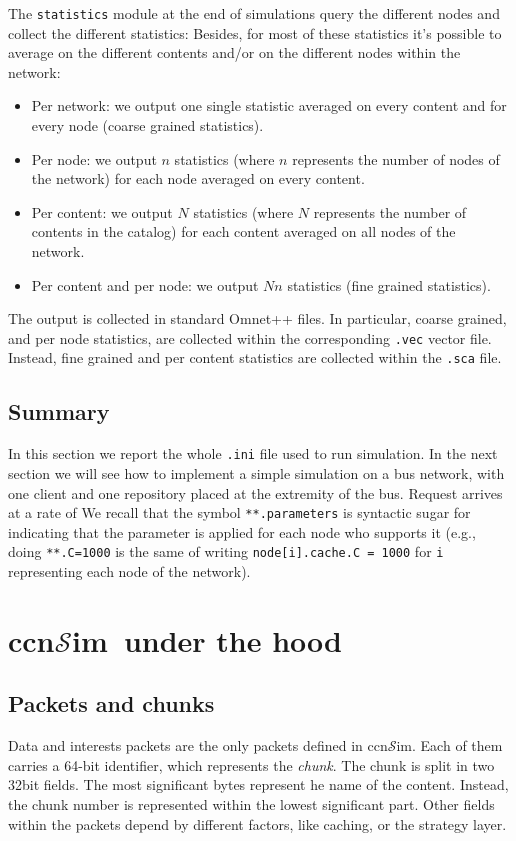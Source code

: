 \documentclass{article}
\newcommand{\ccnsim}{ccn$\mathcal{S}$im}
\begin{document}
The \verb|statistics| module at the end of simulations query the different nodes and collect the different statistics: Besides, for most of these statistics it's possible to average on the different contents and/or on the different nodes within the network:
\begin{itemize}
    \item Per network: we output one single statistic averaged on every content and for every node (coarse grained statistics).
    \item Per node: we output $n$ statistics (where $n$ represents the number of nodes of the network) for each node averaged on every content.
    \item Per content: we output $N$ statistics (where $N$ represents the number of contents in the catalog) for each content averaged on all nodes of the network.
    \item Per content and per node: we output $Nn$ statistics (fine grained statistics). 
\end{itemize}
The output is collected in standard Omnet++ files. In particular, coarse grained, and per node statistics, are collected within the corresponding \verb|.vec| vector file. Instead, fine grained and per content statistics are collected within the \verb|.sca| file. 


\subsection{Summary}
In this section we report the whole \verb|.ini| file used to run simulation. In the next section we will see how to implement a simple simulation on a bus network, with one client and one repository placed at the extremity of the bus. Request arrives at a rate of We recall that the symbol \verb|**.parameters| is syntactic sugar for indicating that the parameter is applied for each node who supports it (e.g., doing \verb|**.C=1000| is the same of writing \verb|node[i].cache.C = 1000| for \verb|i| representing each node of the network). 

\section{\ccnsim\ under the hood}\label{sec:hood}
\subsection{Packets and chunks}
Data and interests packets are the only packets defined in \ccnsim. Each of them carries a 64-bit identifier, which represents the  \emph{chunk}. The chunk is split in two 32bit fields. The most significant bytes represent he name of the content. Instead, the chunk number is represented  within the lowest significant part. Other fields within the packets depend by different factors, like caching, or the strategy layer.
\end{document}
